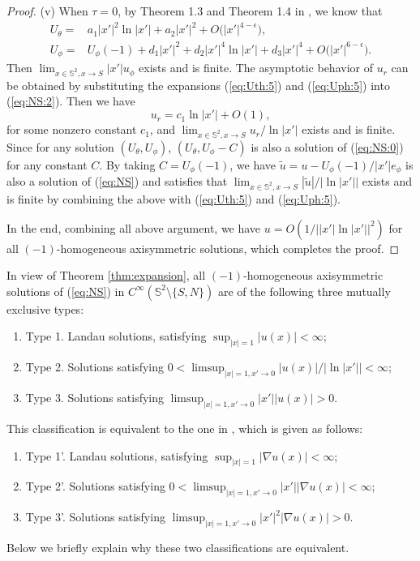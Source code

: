 \documentclass[12pt]{article}
\begin{document}
\begin{proof}
	(v) When $\tau=0$, by Theorem 1.3 and Theorem 1.4 in \cite{LLY1}, we know that 
	\begin{align}
		U_\theta = & a_1 |x'|^2 \ln |x'| + a_2 |x'|^2 + O\big( |x'|^{4-\epsilon} \big), \label{eq:Uth:5} \\
		U_\phi = & U_\phi(-1) + d_1 |x'|^{2} + d_2 |x'|^{4} \ln |x'| + d_3 |x'|^4 + O\big( |x'|^{6-\epsilon} \big). \label{eq:Uph:5}
 	\end{align}
	Then $\lim_{x\in\mathbb{S}^2,x\to S} |x'|u_\phi$ exists and is finite. The asymptotic behavior of $u_r$ can be obtained by substituting the expansions (\ref{eq:Uth:5}) and (\ref{eq:Uph:5}) into (\ref{eq:NS:2}). Then we have
	\[
		u_r = c_1 \ln |x'| + O(1), 
	\]
	for some nonzero constant $c_1$, and $\lim_{x\in\mathbb{S}^2,x\to S} u_r/ \ln |x'|$ exists and is finite. Since for any solution $(U_{\theta}, U_{\phi})$, $(U_{\theta}, U_{\phi}-C)$ is also a solution of (\ref{eq:NS:0}) for any constant $C$. By taking $C=U_{\phi}(-1)$, we have $\tilde{u}=u-U_{\phi}(-1)/|x'|e_{\phi}$ is also a solution of (\ref{eq:NS}) and satisfies that $\lim_{x\in\mathbb{S}^2,x\to S} |\tilde{u}|/\big| \ln |x'| \big|$ exists and is finite by combining the above with (\ref{eq:Uth:5}) and (\ref{eq:Uph:5}). 	
	
	In the end, combining all above argument, we have $u=O( 1 / \big| |x'| \ln |x'| \big|^2) $ for all $(-1)$-homogeneous axisymmetric solutions, which completes the proof. 
\end{proof}

In view of Theorem \ref{thm:expansion}, 
all $(-1)$-homogeneous axisymmetric solutions of (\ref{eq:NS}) in $C^{\infty}(\mathbb{S}^2\setminus\{S, N\})$ are of the following three mutually exclusive types:
\begin{enumerate}
	\item[]Type 1. Landau solutions, satisfying $\sup_{|x|=1}|u(x)|<\infty$; 
	\item[]Type 2. Solutions satisfying $0<\limsup_{|x|=1,x'\to 0}|u(x)|/| \ln |x'||<\infty$; 
	\item[]Type 3. Solutions satisfying $\limsup_{|x|=1,x'\to 0}|x'||u(x)|>0$. 
\end{enumerate}
This classification is equivalent to the one in \cite{LY7}, which is given as follows: 
\begin{enumerate}
	\item[]Type 1'. Landau solutions, satisfying $\sup_{|x|=1}|\nabla u(x)|<\infty$; 
	\item[]Type 2'. Solutions satisfying 
	$0<\limsup_{|x|=1,x'\to 0}|x'||\nabla u(x)|<\infty$; 
	\item[]Type 3'. Solutions satisfying 
	$\limsup_{|x|=1,x'\to 0}|x'|^2|\nabla u(x)|>0$.
\end{enumerate}
Below we briefly explain why these two classifications are equivalent. 
\end{document}
